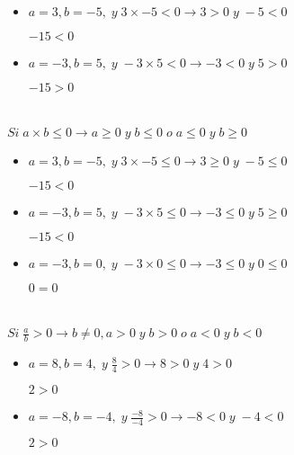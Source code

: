 \documentclass[12pt, letterpaper, twoside]{article}
\begin{document}
\begin{itemize}
    \item $a = 3, b = -5, \;y\; 3 \times -5 < 0 \to 3 > 0 \;y\; -5 < 0$
    
    $-15 < 0$

    \item $a = -3, b = 5, \;y\; -3 \times 5 < 0 \to -3 < 0 \;y\; 5 > 0$
    
    $-15 > 0$
\end{itemize}

\section{}

$Si \; a \times b  \leq  0 \to a \geq 0 \;y\; b  \leq  0 \; o \; a  \leq  0 \;y\; b \geq 0$

\begin{itemize}
    \item $a = 3, b = -5, \;y\; 3 \times -5  \leq  0 \to 3 \geq 0 \;y\; -5  \leq  0$
    
    $-15 < 0$

    \item $a = -3, b = 5, \;y\; -3 \times 5  \leq  0 \to -3  \leq  0 \;y\; 5 \geq 0$
    
    $-15 < 0$

    \item $a = -3, b = 0, \;y\; -3 \times 0  \leq  0 \to -3  \leq  0 \;y\; 0  \leq  0$
    
    $0 = 0$

\end{itemize}

\section{}

$Si \; \frac{a}{b} > 0 \to b \neq 0, a > 0 \;y\; b > 0 \; o \; a < 0 \;y\; b < 0$

\begin{itemize}
    \item $a = 8, b = 4, \;y\; \frac{8}{4} > 0 \to 8 > 0 \;y\; 4 > 0$
    
    $2 > 0$

    \item $a = -8, b = -4, \;y\; \frac{-8}{-4} > 0 \to -8 < 0 \;y\; -4 < 0$
    
    $2 > 0$
\end{itemize}

\section{}
\end{document}
